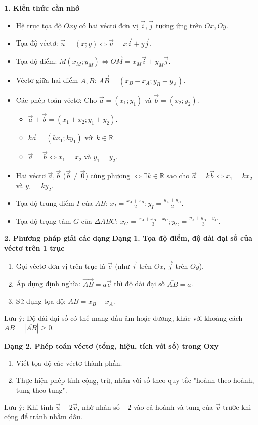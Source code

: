 \textbf{1. Kiến thức cần nhớ}
\begin{itemize}
\item Hệ trục tọa độ $Oxy$ có hai véctơ đơn vị $\vec{i}, \vec{j}$ tương ứng trên $Ox, Oy$.
\item Tọa độ véctơ: $\vec{u} = (x;y) \Leftrightarrow \vec{u} = x\vec{i} + y\vec{j}$.
\item Tọa độ điểm: $M(x_M; y_M) \Leftrightarrow \overrightarrow{OM} = x_M\vec{i} + y_M\vec{j}$.
\item Véctơ giữa hai điểm $A, B$: $\overrightarrow{AB} = (x_B - x_A; y_B - y_A)$.
\item Các phép toán véctơ: Cho $\vec{a} = (x_1; y_1)$ và $\vec{b} = (x_2; y_2)$.
  \begin{itemize}
  \item $\vec{a} \pm \vec{b} = (x_1 \pm x_2; y_1 \pm y_2)$.
  \item $k\vec{a} = (kx_1; ky_1)$ với $k \in \mathbb{R}$.
  \item $\vec{a} = \vec{b} \Leftrightarrow x_1 = x_2$ và $y_1 = y_2$.
  \end{itemize}
\item Hai véctơ $\vec{a}, \vec{b}$ ($\vec{b} \neq \vec{0}$) cùng phương $\Leftrightarrow \exists k \in \mathbb{R}$ sao cho $\vec{a} = k\vec{b} \Leftrightarrow x_1 = k x_2$ và $y_1 = k y_2$.
\item Tọa độ trung điểm $I$ của $AB$: $\boxed{x_I = \frac{x_A + x_B}{2}; y_I = \frac{y_A + y_B}{2}}$.
\item Tọa độ trọng tâm $G$ của $\Delta ABC$: $\boxed{x_G = \frac{x_A + x_B + x_C}{3}; y_G = \frac{y_A + y_B + y_C}{3}}$.
\end{itemize}

\textbf{2. Phương pháp giải các dạng}
\textbf{Dạng 1. Tọa độ điểm, độ dài đại số của véctơ trên 1 trục}
\begin{enumerate}
\item Gọi véctơ đơn vị trên trục là $\vec{e}$ (như $\vec{i}$ trên $Ox$, $\vec{j}$ trên $Oy$).
\item Áp dụng định nghĩa: $\overrightarrow{AB} = a\vec{e}$ thì độ dài đại số $\overline{AB} = a$.
\item Sử dụng tọa độ: $\overline{AB} = x_B - x_A$.
\end{enumerate}
Lưu ý: Độ dài đại số có thể mang dấu âm hoặc dương, khác với khoảng cách $AB = |\overline{AB}| \ge 0$.

\textbf{Dạng 2. Phép toán véctơ (tổng, hiệu, tích với số) trong Oxy}
\begin{enumerate}
\item Viết tọa độ các véctơ thành phần.
\item Thực hiện phép tính cộng, trừ, nhân với số theo quy tắc "hoành theo hoành, tung theo tung".
\end{enumerate}
Lưu ý: Khi tính $\vec{u} - 2\vec{v}$, nhớ nhân số $-2$ vào cả hoành và tung của $\vec{v}$ trước khi cộng để tránh nhầm dấu.

